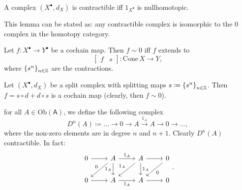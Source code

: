 \begin{lem}
	A complex $\left( X^{\bullet}, d_{X} \right)$ is contractible iff
	$1_{X^\bullet}$ is nullhomotopic.
\end{lem}
\begin{rem}[]
	This lemma can be stated as: any contractible complex is isomorphic to
	the $0$ complex in the homotopy category.
\end{rem}

\begin{lem}
	Let $f: X^\bullet \to Y^\bullet$ be a cochain map.
	Then $f \sim 0$ iff $f$ extends to
	\begin{equation}
		\begin{bmatrix}
			f & s
		\end{bmatrix} 
		\colon \mathrm{Cone}\, X \to Y
	,\end{equation} 
	where $\left\{ s^n \right\}_{n \in \mathbb{Z}}$ are the contractions.
\end{lem} 

\begin{lem}
	Let $\left( X^{\bullet}, d_{X} \right)$ be a split complex
	with splitting maps $s \coloneqq \left\{ s^n \right\}_{n \in \mathbb{Z}}$.
	Then $f = s \circ d + d \circ s$ is a cochain map (clearly, then $f \sim 0$).
\end{lem} 

\begin{rem}[]
	for all $A \in \mathrm{Ob} \left(\mathsf{A}\right)$, we define the following complex
	\begin{equation}
		D^n(A) \coloneqq 
		\ldots \to 0 \to A \xrightarrow{1_A} A \to 0 \to \ldots
	,\end{equation} 
	where the non-zero elements are in degree $n$ and $n+1$.
	Clearly $D^n(A)$ contractible. In fact:
	\begin{equation}
	\begin{tikzcd}
		0 \arrow[r, "", rightarrow] &
		A \arrow[r, "1_A", rightarrow] \arrow[ld, "0"', rightarrow] \arrow[d, "1_A"', rightarrow] &
		A \arrow[r, "", rightarrow] \arrow[ld, "1_A"', rightarrow] \arrow[d, "1_A", rightarrow] &
		0 \arrow[ld, "0", rightarrow] \\
		0 \arrow[r, "", rightarrow] &
		A \arrow[r, "1_A"', rightarrow] &
		A \arrow[r, "", rightarrow] &
		0 
	\end{tikzcd}
	.\end{equation} 
\end{rem}

